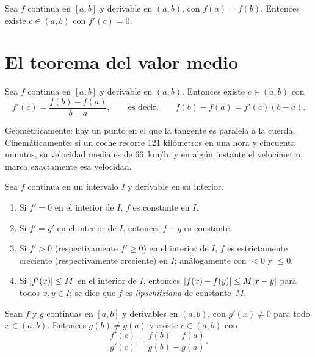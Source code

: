 \begin{teorema}[Rolle]\label{teo:rolle}
Sea $f$ continua en $[a,b]$ y derivable en $(a,b)$, con $f(a)=f(b)$. Entonces existe $c\in(a,b)$ con $f'(c)=0$.
\end{teorema}

\section{El teorema del valor medio}

\begin{teorema}\label{teo:tvm}
Sea $f$ continua en $[a,b]$ y derivable en $(a,b)$. Entonces existe $c\in(a,b)$ con
\[
f'(c)=\frac{f(b)-f(a)}{b-a},\qquad\text{es decir,}\qquad f(b)-f(a)=f'(c)(b-a).
\]
\end{teorema}

Geométricamente: hay un punto en el que la tangente es paralela a la cuerda. Cinemáticamente: si un coche recorre 121 kilómetros en una hora y cincuenta minutos, su velocidad media es de 66~km/h, y en algún instante el velocímetro marca exactamente esa velocidad.

\begin{corolario}\label{cor:tvm}
Sea $f$ continua en un intervalo $I$ y derivable en su interior.
\begin{enumerate}
  \item Si $f'=0$ en el interior de $I$, $f$ es constante en $I$.
  \item Si $f'=g'$ en el interior de $I$, entonces $f-g$ es constante.
  \item Si $f'>0$ (respectivamente $f'\ge0$) en el interior de $I$, $f$ es estrictamente creciente (respectivamente creciente) en $I$; análogamente con $<0$ y $\le0$.
  \item Si $\lvert f'(x)\rvert\le M$ en el interior de $I$, entonces $\lvert f(x)-f(y)\rvert\le M\lvert x-y\rvert$ para todos $x,y\in I$; se dice que $f$ es \emph{lipschitziana} de constante~$M$.
\end{enumerate}
\end{corolario}

\addtocounter{definicion}{1}%

\begin{teorema}\label{teo:cauchy}
Sean $f$ y $g$ continuas en $[a,b]$ y derivables en $(a,b)$, con $g'(x)\ne0$ para todo $x\in(a,b)$. Entonces $g(b)\ne g(a)$ y existe $c\in(a,b)$ con
\[
\frac{f'(c)}{g'(c)}=\frac{f(b)-f(a)}{g(b)-g(a)}.
\]
\end{teorema}

